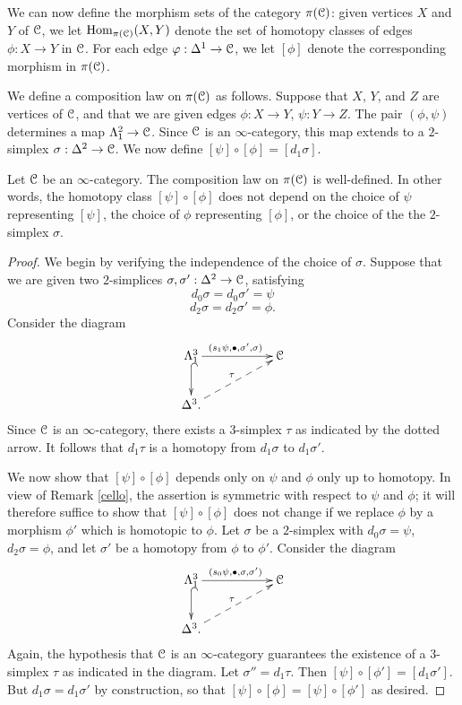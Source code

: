 \begin{1.2.3 The homotopy category}
We can now define the morphism sets of the category $\pi(\operatorname{\mathcal{C}})$: given vertices $X$ and $Y$ of $\operatorname{\mathcal{C}}$, we let $\operatorname{Hom}_{\pi(\operatorname{\mathcal{C}})}(X,Y)$ denote the set of homotopy
classes of edges $\phi: X \rightarrow Y$ in $\operatorname{\mathcal{C}}$. For each edge
$\varphi: \Delta^1 \rightarrow \operatorname{\mathcal{C}}$, we let $[ \phi ]$ denote the corresponding morphism in
$\pi(\operatorname{\mathcal{C}})$.

We define a composition law on $\pi(\operatorname{\mathcal{C}})$ as follows. Suppose that $X$, $Y$, and $Z$ are vertices of $\operatorname{\mathcal{C}}$, and that we are given 
edges $\phi: X \rightarrow Y$, $ \psi : Y \rightarrow Z$.
The pair $(\phi, \psi)$ determines a map $\Lambda^2_1 \rightarrow \operatorname{\mathcal{C}}$. Since $\operatorname{\mathcal{C}}$ is an $\infty$-category, this map extends to a $2$-simplex $\sigma: \Delta^2 \rightarrow \operatorname{\mathcal{C}}$. We now define
$[ \psi] \circ [ \phi ] = [ d_1 \sigma ]$.

\begin{proposition}\label{trug}
Let $\operatorname{\mathcal{C}}$ be an $\infty$-category.
The composition law on $\pi(\operatorname{\mathcal{C}})$ is well-defined. In other words, the homotopy class $[\psi] \circ [\phi]$ does not depend on the choice of $\psi$ representing $[\psi]$, the choice of $\phi$ representing $[ \phi]$, or the choice of the the $2$-simplex $\sigma$.
\end{proposition}

\begin{proof}
We begin by verifying the independence of the choice of $\sigma$. Suppose that we are given two $2$-simplices $\sigma, \sigma': \Delta^2 \rightarrow \operatorname{\mathcal{C}}$, satisfying
$$ d_0 \sigma = d_0 \sigma' = \psi $$
$$ d_2 \sigma = d_2 \sigma' = \phi.$$
Consider the diagram
$$ \xymatrix{ \Lambda^3_1 \ar@{^{(}->}[d] \ar[rr]^{( s_1 \psi, \bigdot, \sigma', \sigma)} & & \calC \\
\Delta^3 \ar@{-->}[urr]^{\tau}. & & }$$
Since $\operatorname{\mathcal{C}}$ is an $\infty$-category, there exists a $3$-simplex $\tau$ as indicated by the dotted arrow. It follows that $d_1 \tau$ is a homotopy from $d_1 \sigma$ to $d_1 \sigma'$.

We now show that $[\psi ] \circ [\phi]$ depends only on $\psi$ and $\phi$ only up to homotopy.
In view of Remark \ref{cello}, the assertion is symmetric with respect to $\psi$ and $\phi$; it will therefore suffice to show that $[ \psi ] \circ [ \phi ]$ does not change if we replace $\phi$ by a morphism $\phi'$ which is homotopic to $\phi$. Let $\sigma$ be a $2$-simplex with
$d_0 \sigma = \psi$, $d_2 \sigma = \phi$, and let $\sigma'$ be a homotopy from $\phi$ to $\phi'$.
Consider the diagram
$$ \xymatrix{ \Lambda^3_1 \ar@{^{(}->}[d] \ar[rr]^{ (s_0 \psi, \bigdot, \sigma, \sigma') } & & \calC \\
\Delta^3. \ar@{-->}[urr]^{\tau} & & }$$
Again, the hypothesis that $\operatorname{\mathcal{C}}$ is an $\infty$-category guarantees the existence of a $3$-simplex $\tau$ as indicated in the diagram. Let $\sigma'' = d_1 \tau$. Then 
$[ \psi ] \circ [ \phi' ] = [ d_1 \sigma' ]$. But $d_1 \sigma = d_1 \sigma'$ by construction, so that
$[ \psi ] \circ [ \phi ] = [ \psi ] \circ [ \phi' ]$ as desired.
\end{proof}


\end{1.2.3 The homotopy category}

